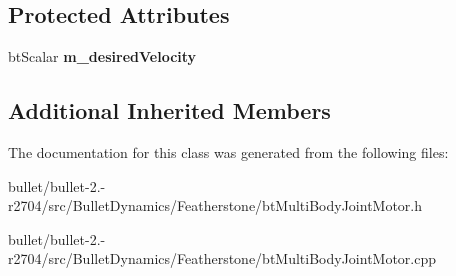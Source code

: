 \subsection*{Protected Attributes}
\begin{DoxyCompactItemize}
\item 
\hypertarget{classbt_multi_body_joint_motor_a2f8f33635134f3289d769b90381701b0}{bt\+Scalar {\bfseries m\+\_\+desired\+Velocity}}\label{classbt_multi_body_joint_motor_a2f8f33635134f3289d769b90381701b0}

\end{DoxyCompactItemize}
\subsection*{Additional Inherited Members}


The documentation for this class was generated from the following files\+:\begin{DoxyCompactItemize}
\item 
bullet/bullet-\/2.-\/r2704/src/\+Bullet\+Dynamics/\+Featherstone/bt\+Multi\+Body\+Joint\+Motor.\+h\item 
bullet/bullet-\/2.-\/r2704/src/\+Bullet\+Dynamics/\+Featherstone/bt\+Multi\+Body\+Joint\+Motor.\+cpp\end{DoxyCompactItemize}
